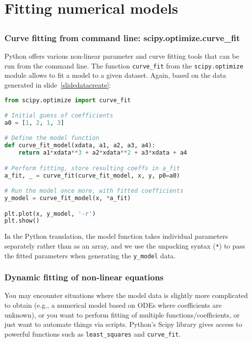 \section{Fitting numerical models}
\subsection*{}
\begin{frame}[fragile]
  \frametitle{Curve fitting from command line: scipy.optimize.curve\_fit}
  Python offers various non-linear parameter and curve fitting tools that can be run from the command line. The function \lstinline$curve_fit$ from the \lstinline$scipy.optimize$ module allows to fit a model to a given dataset. Again, based on the data generated in slide~\ref{slidedatacreate}:
    \begin{lstlisting}[language=Python,basicstyle=\tiny]
from scipy.optimize import curve_fit

# Initial guess of coefficients
a0 = [1, 2, 1, 3]

# Define the model function
def curve_fit_model(xdata, a1, a2, a3, a4):
    return a1*xdata**3 + a2*xdata**2 + a3*xdata + a4

# Perform fitting, store resulting coeffs in a_fit
a_fit, _ = curve_fit(curve_fit_model, x, y, p0=a0)

# Run the model once more, with fitted coefficients
y_model = curve_fit_model(x, *a_fit)

plt.plot(x, y_model, '-r')
plt.show()
    \end{lstlisting}
    In the Python translation, the model function takes individual parameters separately rather than as an array, and we use the unpacking syntax (\lstinline$*$) to pass the fitted parameters when generating the \lstinline$y_model$ data.
  \end{frame}
  

  \begin{frame}[fragile] 
    \frametitle{Dynamic fitting of non-linear equations}
    You may encounter situations where the model data is slightly more complicated to obtain (e.g., a numerical model based on ODEs where coefficients are unknown), or you want to perform fitting of multiple functions/coefficients, or just want to automate things via scripts. Python's Scipy library gives access to powerful functions such as \lstinline$least_squares$ and \lstinline$curve_fit$.
  \end{frame}
    
